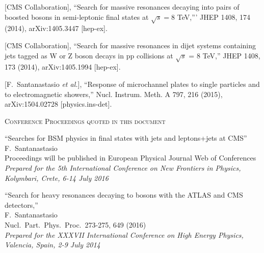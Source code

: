\documentclass[10pt, a4paper]{article}
\begin{document}
\begin{thebibliography}{599}
  [CMS Collaboration],
  ``Search for massive resonances decaying into pairs of boosted
  bosons in semi-leptonic final states at $\sqrt{s}=8$ TeV,'''
  JHEP 1408, 174 (2014), arXiv:1405.3447 [hep-ex].

 [CMS Collaboration],
  ``Search for massive resonances in dijet systems containing jets
  tagged as W or Z boson decays in pp collisions at $ \sqrt{s} $ = 8 TeV,''
  JHEP 1408, 173 (2014), arXiv:1405.1994 [hep-ex].

[F.~Santanastasio {\it et al.}],
  ``Response of microchannel plates to single particles and to electromagnetic showers,''
Nucl. Instrum. Meth. A 797, 216 (2015), arXiv:1504.02728 [physics.ins-det].\\

\vspace{0.1cm} \begin{center} \textsc{Conference Proceedings quoted in
    this document} \end{center} \vspace{0.05cm}

  ``Searches for BSM physics in ﬁnal states with jets and leptons+jets at CMS''
  \\{}F.~Santanastasio
   \\{} Proceedings will be published in European Physical Journal Web of Conferences
  \\{}{\it Prepared for the 5th International Conference on New
    Frontiers in Physics, Kolymbari, Crete, 6-14 July 2016} 

``Search for heavy resonances decaying to bosons with the ATLAS and CMS detectors,'' 
 \\{}F.~Santanastasio 
 \\ Nucl.\ Part.\ Phys.\ Proc.\  273-275, 649 (2016)
  \\{}{\it Prepared for the XXXVII International Conference on High Energy Physics, Valencia, Spain, 2-9 July 2014}


\end{thebibliography}
\end{document}
